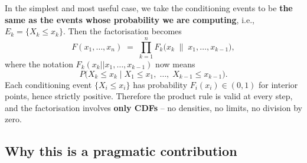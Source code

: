 In the simplest and most useful case, we take the conditioning events to be \textbf{the same as the events whose probability we are computing}, i.e., $E_k = \{X_k \le x_k\}$. Then the factorisation becomes
\[
\boxed{
F(x_1,\dots,x_n) \;=\; \prod_{k=1}^{n} F_k\bigl(x_k \;\big\|\; x_1,\dots,x_{k-1}\bigr) },
\]
where the notation $F_k(x_k || x_1,\dots,x_{k-1})$ now means
\[
P\bigl(X_k \le x_k \;\big|\; X_1 \le x_1,\; \dots,\; X_{k-1} \le x_{k-1}\bigr).
\]
Each conditioning event $\{X_i \le x_i\}$ has probability $F_i(x_i) \in (0,1)$ for interior points, hence strictly positive. Therefore the product rule is valid at every step, and the factorisation involves \textbf{only CDFs} – no densities, no limits, no division by zero.

\subsection{Why this is a pragmatic contribution}

